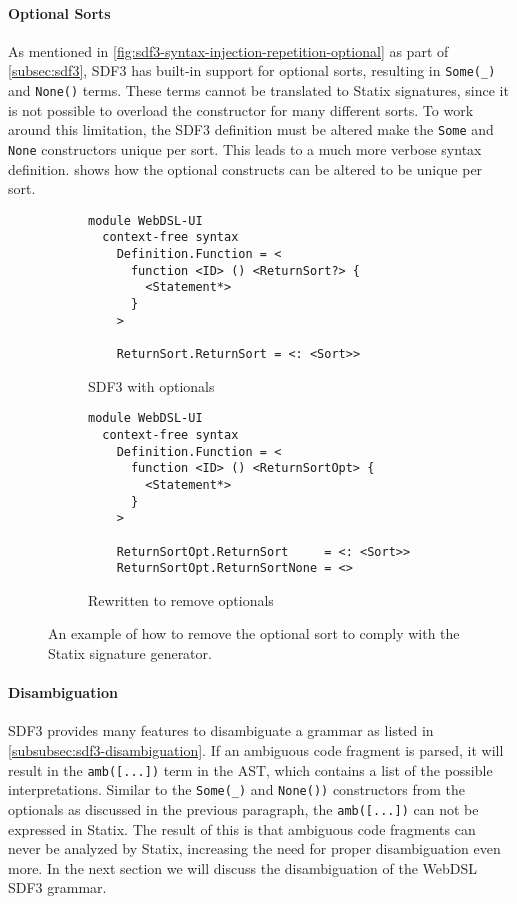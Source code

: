      \paragraph{Optional Sorts} As mentioned in \cref{fig:sdf3-syntax-injection-repetition-optional} as part of \cref{subsec:sdf3}, SDF3 has built-in support for optional sorts, resulting in \texttt{Some(\_)} and \texttt{None()} terms. These terms cannot be  translated to Statix signatures, since it is not possible to overload the constructor for many different sorts. To work around this limitation, the SDF3 definition must be altered make the \texttt{Some} and \texttt{None} constructors unique per sort. This leads to a much more verbose syntax definition.  shows how the optional constructs can be altered to be unique per sort.

      \begin{figure}
        \begin{subfigure}[b]{1\textwidth}
          \begin{verbatim}
module WebDSL-UI
  context-free syntax
    Definition.Function = <
      function <ID> () <ReturnSort?> {
        <Statement*>
      }
    >

    ReturnSort.ReturnSort = <: <Sort>>
          \end{verbatim}
          \caption{\label{fig:sdf3-remove-optionals-before}SDF3 with optionals}
        \end{subfigure}
        \begin{subfigure}[b]{1\textwidth}
          \begin{verbatim}
module WebDSL-UI
  context-free syntax
    Definition.Function = <
      function <ID> () <ReturnSortOpt> {
        <Statement*>
      }
    >

    ReturnSortOpt.ReturnSort     = <: <Sort>>
    ReturnSortOpt.ReturnSortNone = <>
          \end{verbatim}
          \caption{\label{fig:sdf3-remove-optionals-after}Rewritten to remove optionals}
        \end{subfigure}
      \caption{\label{fig:sdf3-remove-optionals}An example of how to remove the optional sort to comply with the Statix signature generator.}
      \end{figure}

      \paragraph{Disambiguation} SDF3 provides many features to disambiguate a grammar as listed in \cref{subsubsec:sdf3-disambiguation}. If an ambiguous code fragment is parsed, it will result in the \texttt{amb([...])} term in the AST, which contains a list of the possible interpretations. Similar to the \texttt{Some(\_)} and \texttt{None())} constructors from the optionals as discussed in the previous paragraph, the \texttt{amb([...])} can not be expressed in Statix. The result of this is that ambiguous code fragments can never be analyzed by Statix, increasing the need for proper disambiguation even more. In the next section we will discuss the disambiguation of the WebDSL SDF3 grammar.

